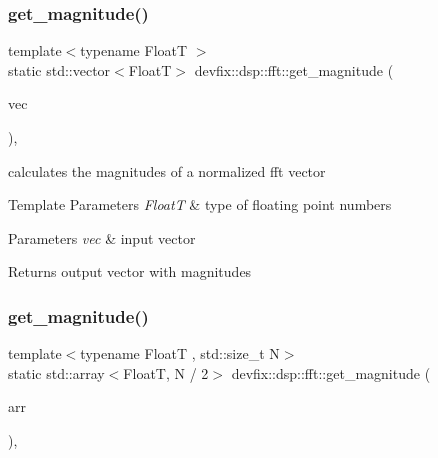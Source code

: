 \subsubsection{\texorpdfstring{get\+\_\+magnitude()}{get\_magnitude()}\hspace{0.1cm}{\footnotesize\ttfamily [2/3]}}
{\footnotesize\ttfamily template$<$typename FloatT $>$ \\
static std\+::vector$<$FloatT$>$ devfix\+::dsp\+::fft\+::get\+\_\+magnitude (\begin{DoxyParamCaption}\item[{const std\+::vector$<$ std\+::complex$<$ FloatT $>$$>$ \&}]{vec }\end{DoxyParamCaption})\hspace{0.3cm}{\ttfamily [inline]}, {\ttfamily [static]}}



calculates the magnitudes of a normalized fft vector 


\begin{DoxyTemplParams}{Template Parameters}
{\em FloatT} & type of floating point numbers \\
\hline
\end{DoxyTemplParams}

\begin{DoxyParams}{Parameters}
{\em vec} & input vector \\
\hline
\end{DoxyParams}
\begin{DoxyReturn}{Returns}
output vector with magnitudes 
\end{DoxyReturn}
\mbox{\label{structdevfix_1_1dsp_1_1fft_aca37b18e5e6352088d9f24a71a6e3573}} 
\subsubsection{\texorpdfstring{get\+\_\+magnitude()}{get\_magnitude()}\hspace{0.1cm}{\footnotesize\ttfamily [3/3]}}
{\footnotesize\ttfamily template$<$typename FloatT , std\+::size\+\_\+t N$>$ \\
static std\+::array$<$FloatT, N / 2$>$ devfix\+::dsp\+::fft\+::get\+\_\+magnitude (\begin{DoxyParamCaption}\item[{const std\+::array$<$ std\+::complex$<$ FloatT $>$, N $>$ \&}]{arr }\end{DoxyParamCaption})\hspace{0.3cm}{\ttfamily [inline]}, {\ttfamily [static]}}



